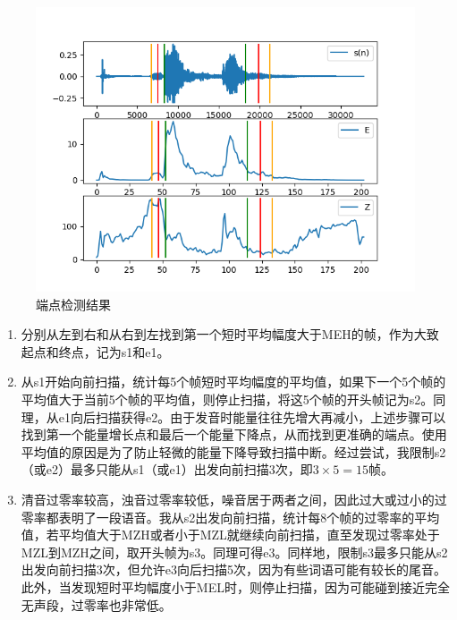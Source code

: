 \documentclass[UTF8]{article}
\begin{document}
\begin{figure}[t]
	\begin{center}
		\includegraphics[width=\textwidth]{img/16307110258-11-15.png}
	\end{center}
	\caption{端点检测结果}
	\label{fig:epd}
\end{figure}

\begin{enumerate}
	\item 分别从左到右和从右到左找到第一个短时平均幅度大于MEH的帧，作为大致起点和终点，记为s1和e1。
	\item 从s1开始向前扫描，统计每5个帧短时平均幅度的平均值，如果下一个5个帧的平均值大于当前5个帧的平均值，则停止扫描，将这5个帧的开头帧记为s2。同理，从e1向后扫描获得e2。由于发音时能量往往先增大再减小，上述步骤可以找到第一个能量增长点和最后一个能量下降点，从而找到更准确的端点。使用平均值的原因是为了防止轻微的能量下降导致扫描中断。经过尝试，我限制s2（或e2）最多只能从s1（或e1）出发向前扫描3次，即$3 \times 5=15$帧。
	\item 清音过零率较高，浊音过零率较低，噪音居于两者之间，因此过大或过小的过零率都表明了一段语音。我从s2出发向前扫描，统计每8个帧的过零率的平均值，若平均值大于MZH或者小于MZL就继续向前扫描，直至发现过零率处于MZL到MZH之间，取开头帧为s3。同理可得e3。同样地，限制s3最多只能从s2出发向前扫描3次，但允许e3向后扫描5次，因为有些词语可能有较长的尾音。此外，当发现短时平均幅度小于MEL时，则停止扫描，因为可能碰到接近完全无声段，过零率也非常低。
\end{enumerate}
\end{document}
